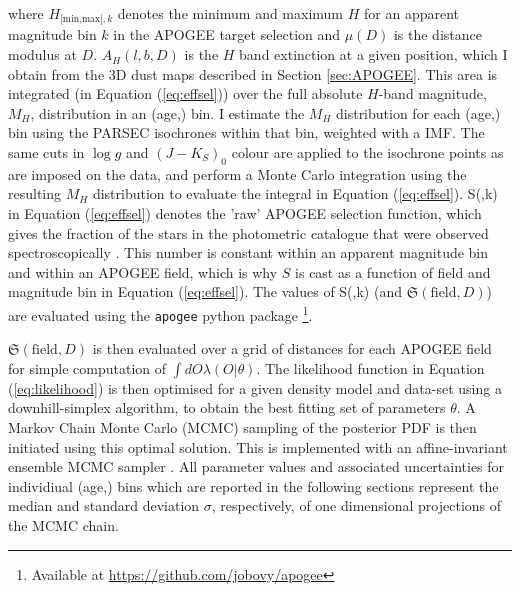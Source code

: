  where $H_{\text{[min,max]},k}$ denotes the minimum and maximum $H$ for an apparent magnitude bin $k$ in the APOGEE target selection and $\mu(D)$ is the distance modulus at $D$.  $A_H(l,b,D)$ is the $H$ band extinction at a given position, which I obtain from the 3D dust maps described in Section \ref{sec:APOGEE}. This area is integrated (in Equation (\ref{eq:effsel})) over the full absolute $H$-band magnitude, $M_H$, distribution in an (age,\feh{}) bin. I estimate the $M_H$ distribution for each (age,\feh{}) bin using the PARSEC isochrones \citep{2012MNRAS.427..127B} within that bin, weighted with a \citet{2003PASP..115..763C} IMF. The same cuts in $\log{g}$ and $(J-K_S)_0$ colour are applied to the isochrone points as are imposed on the data, and perform a Monte Carlo integration using the resulting $M_H$ distribution to evaluate the integral in Equation (\ref{eq:effsel}). S(,k) in Equation (\ref{eq:effsel}) denotes the 'raw' APOGEE selection function, which gives the fraction of the stars in the photometric catalogue that were observed spectroscopically \citep[see][for details]{2013AJ....146...81Z}. This number is constant within an apparent magnitude bin and within an APOGEE field, which is why $S$ is cast as a function of field and magnitude bin in Equation (\ref{eq:effsel}). The values of S(,k) (and $\mathfrak{S}(\text{field}, D)$) are evaluated using the \texttt{apogee} python package \footnote{Available at \url{https://github.com/jobovy/apogee}}.

$\mathfrak{S}(\text{field}, D)$ is then evaluated over a grid of distances for each APOGEE field for simple computation of $\int dO \lambda(O|\theta)$. The likelihood function in Equation (\ref{eq:likelihood}) is then optimised for a given density model and data-set using a downhill-simplex algorithm, to obtain the best fitting set of parameters $\theta$. A Markov Chain Monte Carlo (MCMC) sampling of the posterior PDF is then initiated using this optimal solution. This is implemented with an affine-invariant ensemble MCMC sampler  \citep{goodmanweare2010,2013PASP..125..306F}. All parameter values and associated uncertainties for individiual (age,\feh{}) bins which are reported in the following sections represent the median and standard deviation $\sigma$, respectively, of one dimensional projections of the MCMC chain. 

